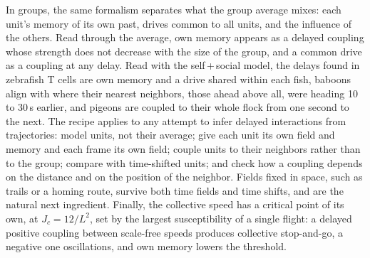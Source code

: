 In groups, the same formalism separates what the group average mixes: each unit's memory of its own past, drives common to all units, and the influence of the others. Read through the average, own memory appears as a delayed coupling whose strength does not decrease with the size of the group, and a common drive as a coupling at any delay. Read with the self\,+\,social model, the delays found in zebrafish T cells are own memory and a drive shared within each fish, baboons align with where their nearest neighbors, those ahead above all, were heading 10 to 30\,s earlier, and pigeons are coupled to their whole flock from one second to the next. The recipe applies to any attempt to infer delayed interactions from trajectories: model units, not their average; give each unit its own field and memory and each frame its own field; couple units to their neighbors rather than to the group; compare with time-shifted units; and check how a coupling depends on the distance and on the position of the neighbor. Fields fixed in space, such as trails or a homing route, survive both time fields and time shifts, and are the natural next ingredient. Finally, the collective speed has a critical point of its own, at $J_c=12/L^2$, set by the largest susceptibility of a single flight: a delayed positive coupling between scale-free speeds produces collective stop-and-go, a negative one oscillations, and own memory lowers the threshold.
